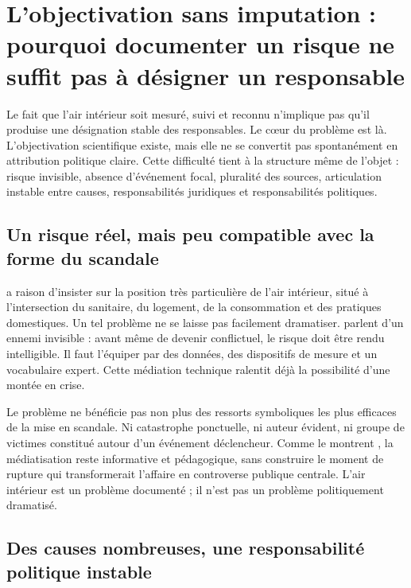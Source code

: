 \documentclass[a4paper,12pt,twoside]{book}
\begin{document}
\chapter{L'objectivation sans imputation : pourquoi documenter un risque ne suffit pas à désigner un responsable}

Le fait que l'air intérieur soit mesuré, suivi et reconnu n'implique pas qu'il produise une désignation stable des responsables. Le c\oe ur du problème est là. L'objectivation scientifique existe, mais elle ne se convertit pas spontanément en attribution politique claire. Cette difficulté tient à la structure même de l'objet : risque invisible, absence d'événement focal, pluralité des sources, articulation instable entre causes, responsabilités juridiques et responsabilités politiques.

\section{Un risque réel, mais peu compatible avec la forme du scandale}

\textcite{LeBourhis2019AirInterieurResponsabilisation} a raison d'insister sur la position très particulière de l'air intérieur, situé à l'intersection du sanitaire, du logement, de la consommation et des pratiques domestiques. Un tel problème ne se laisse pas facilement dramatiser. \textcite{Bedeau2020InvisibleEnemy} parlent d'un \og ennemi invisible \fg : avant même de devenir conflictuel, le risque doit être rendu intelligible. Il faut l'équiper par des données, des dispositifs de mesure et un vocabulaire expert. Cette médiation technique ralentit déjà la possibilité d'une montée en crise.

Le problème ne bénéficie pas non plus des ressorts symboliques les plus efficaces de la mise en scandale. Ni catastrophe ponctuelle, ni auteur évident, ni groupe de victimes constitué autour d'un événement déclencheur. Comme le montrent \textcite{CrespinFerron2016ScandaleRecherchePublic}, la médiatisation reste informative et pédagogique, sans construire le moment de rupture qui transformerait l'affaire en controverse publique centrale. L'air intérieur est un problème documenté ; il n'est pas un problème politiquement dramatisé.

\section{Des causes nombreuses, une responsabilité politique instable}
\end{document}
